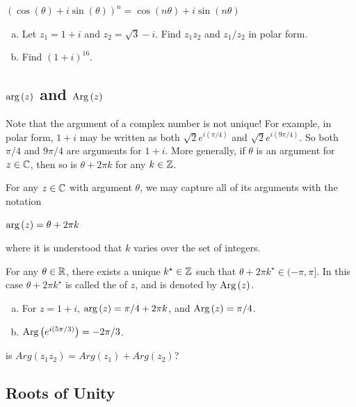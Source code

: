 \documentclass[11pt,fleqn,dvipsnames,usenames]{article}
\newcommand{\p}{\noindent}
\begin{document}
\begin{theorem} $(\cos(\theta) + i\sin(\theta))^{n} = \cos(n\theta) + i\sin(n\theta)$
\end{theorem}

\examples
\begin{enumerate}[(a)]
\item Let $z_{1} = 1 + i$ and $z_{2}  = \sqrt{3} - i$.  Find $z_{1}z_{2}$ and $z_{1}/z_{2}$ in polar form.
\item Find $(1 + i)^{16}$.
\end{enumerate}

\subsection{$\text{arg}\left(z\right)$ and $\text{Arg}\left(z\right)$}

\p Note that the argument of a complex number is not unique!  For example, in polar form, $1 + i$ may be written as both $\sqrt{2}e^{i(\pi/4)}$ and $\sqrt{2}e^{i(9\pi/4)}$.  So both $\pi/4$ and $9\pi/4$ are arguments for $1 + i$.  More generally, if $\theta$ is an argument for $z\in\mathbb{C}$, then so is $\theta + 2\pi k$ for any $k\in \mathbb{Z}$.
\vsp

\notation For any $z\in\mathbb{C}$ with argument $\theta$, we may capture all of its arguments with the notation
\begin{center}
$\text{arg}\left(z\right) = \theta + 2\pi k$
\end{center}
where it is understood that $k$ varies over the set of integers.
\vsp

\fact For any $\theta\in\mathbb{R}$, there exists a unique $k^{\star}\in\mathbb{Z}$ such that $\theta + 2\pi k^{\star}\in (-\pi, \pi]$.  In this case $\theta + 2\pi k^{\star}$ is called the  of $z$, and is denoted by $\text{Arg}\left(z\right)$.
\vsp

\examples
\begin{enumerate}[(a)]
\item For $z = 1 + i$, $\text{arg}\left(z\right) = \pi/4 + 2\pi k$, and $\text{Arg}\left(z\right) = \pi/4$.
\item $\text{Arg}\left(e^{i(5\pi/3)}\right) = -2\pi/3$.
\end{enumerate}

\begin{exercise} is $Arg(z_1z_2) = Arg(z_1) + Arg(z_2)$?
\end{exercise}

\subsection{Roots of Unity}\label{rootsofunitysection}
\end{document}

